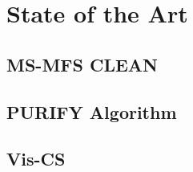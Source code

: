 \section{State of the Art}

\subsection{MS-MFS CLEAN}

\subsection{PURIFY Algorithm}

\subsection{Vis-CS}